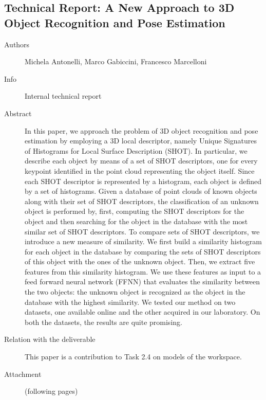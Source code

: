 \documentclass[a4paper,11pt,pdf]{pacmanreport}
\begin{document}
\subsection{Technical Report: A New Approach to 3D Object Recognition and Pose Estimation} \label{ann:reportMichela}
\begin{description}
\item[Authors] Michela Antonelli, Marco Gabiccini, Francesco Marcelloni
\item[Info] Internal technical report
\item[Abstract] In this paper, we approach the problem of 3D object recognition and pose estimation by employing a 3D local descriptor, namely Unique Signatures of Histograms for Local Surface Description
(SHOT). In particular, we describe each object by means of a set of SHOT descriptors, one for every keypoint identified in the point cloud representing the object itself. Since each SHOT descriptor is represented by a histogram, each object is defined by a set of histograms. Given a database of point clouds of known objects along
with their set of SHOT descriptors, the classification of an unknown object is performed by, first, computing the SHOT descriptors for the object and then searching for the object in the database with the most similar set of SHOT descriptors. To compare sets of SHOT descriptors, we introduce a new measure of similarity. We first build a similarity histogram for each object in the database by comparing the sets of SHOT descriptors of this object with the ones of the unknown object. Then, we extract five features from this similarity histogram. We use these features as input to a feed forward neural network (FFNN) that evaluates the similarity between the two objects: the unknown object is recognized as the object in the database with the highest similarity.
We tested our method on two datasets, one available online and the other acquired in our laboratory. On both the datasets, the results are quite promising.
\item[Relation with the deliverable] This paper is a contribution to Task 2.4 on models of the workspace.
\item[Attachment] (following pages)
\end{description}

\end{document}
